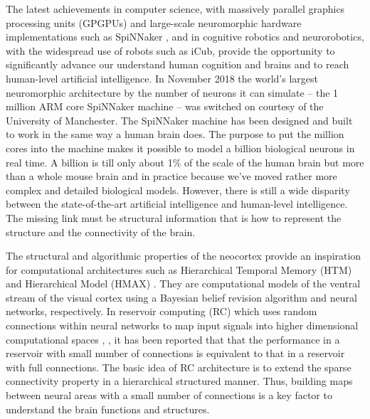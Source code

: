 \documentclass[letterpaper, 10 pt, conference]{ieeeconf}  %
\begin{document}
The latest achievements in computer science, with massively parallel graphics processing units (GPGPUs) and large-scale neuromorphic hardware implementations such as SpiNNaker \cite{Furber2013}, and in cognitive robotics and neurorobotics, with the widespread use of robots such as iCub, provide the opportunity to significantly advance our understand human cognition and brains and to reach human-level artificial intelligence. 
In November 2018 the world’s largest neuromorphic architecture by the number of neurons it can simulate -- the 1 million ARM core SpiNNaker machine \cite{Furber2020}-- was switched on courtesy of the University of Manchester.
The SpiNNaker machine has been designed and built to work in the same way a human brain does.
The purpose to put the million cores into the machine makes it possible to model a billion biological neurons in real time.
A billion is till only about 1\% of the scale of the human brain but more than a whole mouse brain and in practice because we’ve moved rather more complex and detailed biological models.
However, there is still a wide disparity between the state-of-the-art artificial intelligence and human-level intelligence.
The missing link must be structural information that is how to represent the structure and the connectivity of the brain.

The structural and algorithmic properties of the neocortex \cite{schmidhuber2015deep} provide an inspiration for computational architectures such as Hierarchical Temporal Memory (HTM) \cite{Hawkins2004} and  Hierarchical Model (HMAX) \cite{Riesenhuber1999}.
They are computational models of the ventral stream of the visual cortex using a Bayesian belief revision algorithm and neural networks, respectively.
In reservoir computing (RC) which uses random connections within neural networks to map input signals into higher dimensional computational spaces \cite{Lukosevicius2009}, \cite{DeAzambuja2016a}, it has been reported that that the performance in a reservoir with small number of connections is equivalent to that in a reservoir with full connections.
The basic idea of RC architecture is to extend the sparse connectivity property in a hierarchical structured manner.
Thus, building maps between neural areas with a small number of connections is a key factor to understand the brain functions and structures.
\end{document}
